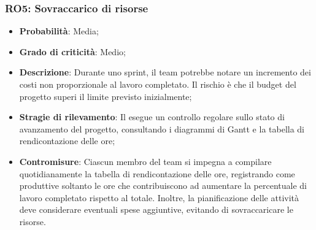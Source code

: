 \subsubsection{RO5: Sovraccarico di risorse}
\begin{itemize}
    \item \textbf{Probabilità}: Media;
    \item \textbf{Grado di criticità}: Medio;
    \item \textbf{Descrizione}: Durante uno sprint, il team potrebbe notare un incremento dei costi non proporzionale al lavoro completato. Il rischio è che il budget del progetto superi il limite previsto inizialmente;
    \item \textbf{Stragie di rilevamento}: Il \Responsabile{} esegue un controllo regolare sullo stato di avanzamento del progetto, consultando i diagrammi di Gantt e la tabella di rendicontazione delle ore;
    \item \textbf{Contromisure}: Ciascun membro del team si impegna a compilare quotidianamente la tabella di rendicontazione delle ore, registrando come produttive soltanto le ore che contribuiscono ad aumentare la percentuale di lavoro completato rispetto al totale. Inoltre, la pianificazione delle attività deve considerare eventuali spese aggiuntive, evitando di sovraccaricare le risorse.
\end{itemize}
